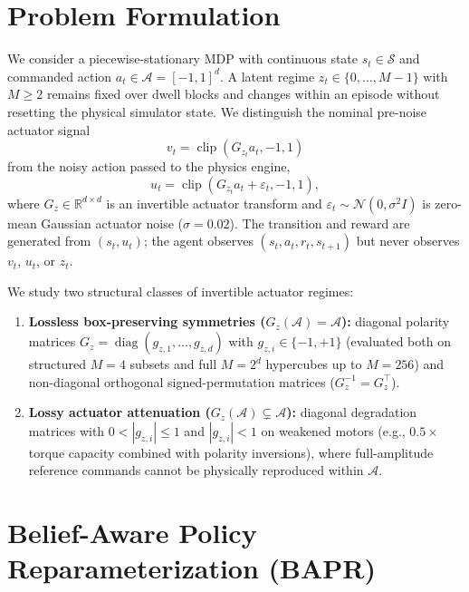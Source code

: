 \documentclass[twoside,11pt]{article}
\newcommand{\gain}{G}
\newcommand{\clip}{\operatorname{clip}}
\begin{document}
\section{Problem Formulation}
\label{sec:problem}

We consider a piecewise-stationary MDP with continuous state $s_t\in\mathcal{S}$ and commanded action $a_t\in\mathcal{A}=[-1,1]^d$. A latent regime $z_t\in\{0,\ldots,M-1\}$ with $M\ge 2$ remains fixed over dwell blocks and changes within an episode without resetting the physical simulator state. We distinguish the nominal pre-noise actuator signal
\begin{equation}
    v_t = \clip\!\left(\gain_{z_t}a_t,-1,1\right)
    \label{eq:nominal_signal}
\end{equation}
from the noisy action passed to the physics engine,
\begin{equation}
    u_t = \clip\!\left(\gain_{z_t} a_t + \varepsilon_t,-1,1\right),
    \label{eq:executed_action}
\end{equation}
where $\gain_z\in\mathbb{R}^{d\times d}$ is an invertible actuator transform and $\varepsilon_t\sim\mathcal{N}(0,\sigma^2 I)$ is zero-mean Gaussian actuator noise ($\sigma=0.02$). The transition and reward are generated from $(s_t,u_t)$; the agent observes $(s_t,a_t,r_t,s_{t+1})$ but never observes $v_t$, $u_t$, or $z_t$.

We study two structural classes of invertible actuator regimes:
\begin{enumerate}[leftmargin=*]
    \item \textbf{Lossless box-preserving symmetries ($\gain_z(\mathcal{A})=\mathcal{A}$):} diagonal polarity matrices $\gain_z=\operatorname{diag}(g_{z,1},\ldots,g_{z,d})$ with $g_{z,i}\in\{-1,+1\}$ (evaluated both on structured $M=4$ subsets and full $M=2^d$ hypercubes up to $M=256$) and non-diagonal orthogonal signed-permutation matrices ($\gain_z^{-1}=\gain_z^\top$).
    \item \textbf{Lossy actuator attenuation ($\gain_z(\mathcal{A})\subsetneq\mathcal{A}$):} diagonal degradation matrices with $0<|g_{z,i}|\le 1$ and $|g_{z,i}|<1$ on weakened motors (e.g., $0.5\times$ torque capacity combined with polarity inversions), where full-amplitude reference commands cannot be physically reproduced within $\mathcal{A}$.
\end{enumerate}

\section{Belief-Aware Policy Reparameterization (BAPR)}
\label{sec:method}
\end{document}
